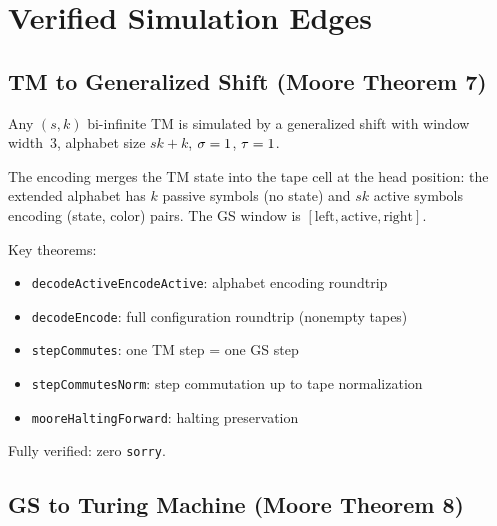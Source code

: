 \chapter{Verified Simulation Edges}\label{ch:verified}

\section{TM to Generalized Shift (Moore Theorem 7)}

\begin{proposition}[TM $\to$ GS]\label{prop:tm-gs}
\leanok
{}
Any $(s,k)$ bi-infinite TM is simulated by a generalized shift with
window width~3, alphabet size $sk+k$, $\sigma = 1$, $\tau = 1$.

The encoding merges the TM state into the tape cell at the head position:
the extended alphabet has $k$ passive symbols (no state) and $sk$ active
symbols encoding (state, color) pairs. The GS window is
$[\mathrm{left}, \mathrm{active}, \mathrm{right}]$.

Key theorems:
\begin{itemize}
\item \texttt{decodeActiveEncodeActive}: alphabet encoding roundtrip
\item \texttt{decodeEncode}: full configuration roundtrip (nonempty tapes)
\item \texttt{stepCommutes}: one TM step = one GS step
\item \texttt{stepCommutesNorm}: step commutation up to tape normalization
\item \texttt{mooreHaltingForward}: halting preservation
\end{itemize}
Fully verified: zero \texttt{sorry}.
\end{proposition}

\section{GS to Turing Machine (Moore Theorem 8)}

